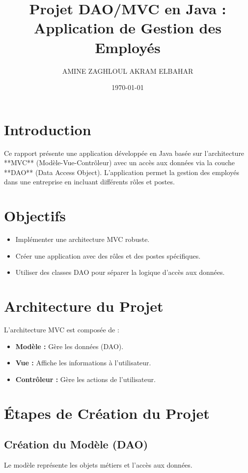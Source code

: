 \documentclass[12pt,a4paper]{article}
\title{Projet DAO/MVC en Java : Application de Gestion des Employés}
\author{AMINE ZAGHLOUL 
        AKRAM ELBAHAR}
\date{\today}
\begin{document}
\maketitle

\tableofcontents

\newpage

\section{Introduction}
Ce rapport présente une application développée en Java basée sur l'architecture **MVC** (Modèle-Vue-Contrôleur) avec un accès aux données via la couche **DAO** (Data Access Object).  
L'application permet la gestion des employés dans une entreprise en incluant différents rôles et postes.

\section{Objectifs}
\begin{itemize}
    \item Implémenter une architecture MVC robuste.
    \item Créer une application avec des rôles et des postes spécifiques.
    \item Utiliser des classes DAO pour séparer la logique d'accès aux données.
\end{itemize}

\section{Architecture du Projet}
L'architecture MVC est composée de :  
\begin{itemize}
    \item \textbf{Modèle :} Gère les données (DAO).
    \item \textbf{Vue :} Affiche les informations à l'utilisateur.
    \item \textbf{Contrôleur :} Gère les actions de l'utilisateur.
\end{itemize}

\section{Étapes de Création du Projet}

\subsection{Création du Modèle (DAO)}
Le modèle représente les objets métiers et l'accès aux données.
\end{document}
